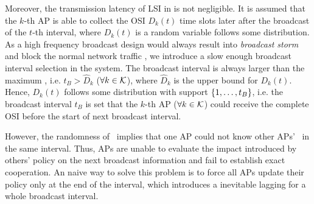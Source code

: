Moreover, the transmission latency of LSI in  is not negligible.
It is assumed that the $k$-th AP is able to collect the OSI $D_{k}(t)$ time slots later after the broadcast of the $t$-th interval, where $D_{k}(t)$ is a random variable follows some distribution.
As a high frequency broadcast design would always result into \emph{broadcast storm} and block the normal network traffic , we introduce a slow enough broadcast interval selection in the system.
The broadcast interval is always larger than the maximum \brdelay, i.e. $t_B > \hat{D}_k$ ($\forall k\in\mathcal{K}$), where $\hat{D}_k$ is the upper bound for $D_{k}({t})$.
Hence, $D_{k}(t)$ follows some distribution with support $\{1,\dots,t_B\}$, i.e. the broadcast interval $t_B$ is set that the $k$-th AP ($\forall k\in\mathcal{K}$) could receive the complete OSI before the start of next broadcast interval.


However, the randomness of \brdelay~implies that one AP could not know other APs' \brdelay~in the same interval.
Thus, APs are unable to evaluate the impact introduced by others' policy on the next broadcast information and fail to establish exact cooperation.
An naive way to solve this problem is to force all APs update their policy only at the end of the interval, which introduces a inevitable lagging for a whole broadcast interval.

